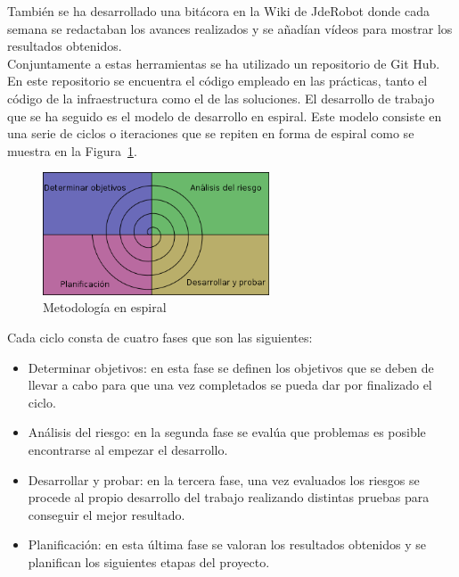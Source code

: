También se ha desarrollado una bitácora en la Wiki de JdeRobot donde cada semana se redactaban los avances realizados y se añadían vídeos para mostrar los resultados obtenidos. \\

Conjuntamente a estas herramientas se ha utilizado un repositorio de Git Hub. En este repositorio se encuentra el código empleado en las prácticas, tanto el código de la infraestructura como el de las soluciones.
El desarrollo de trabajo que se ha seguido es el modelo de desarrollo en espiral. Este modelo consiste en una serie de ciclos o iteraciones que se repiten en forma de espiral como se muestra en la Figura~\ref{fig.espiral}.

\begin{figure}[H]
  \begin{center}
    \includegraphics[width=0.6\textwidth]{figures/Objetivos/espiral.png}
		\caption{Metodología en espiral}
		\label{fig.espiral}
		\end{center}
\end{figure}

Cada ciclo consta de cuatro fases que son las siguientes:
\begin{itemize}
	\item Determinar objetivos: en esta fase se definen los objetivos que se deben de llevar a cabo para que una vez completados se pueda dar por finalizado el ciclo.

	\item Análisis del riesgo: en la segunda fase se evalúa que problemas es posible encontrarse al empezar el desarrollo.

	\item Desarrollar y probar: en la tercera fase, una vez evaluados los riesgos se procede al propio desarrollo del trabajo realizando distintas pruebas para conseguir el mejor resultado.

	\item Planificación: en esta última fase se valoran los resultados obtenidos y se planifican los siguientes etapas del proyecto.
\end{itemize}

